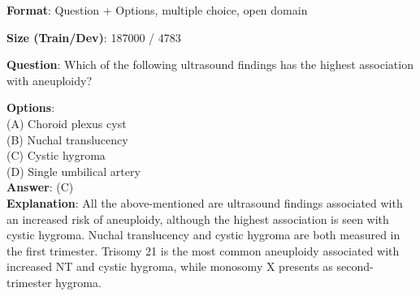 \documentclass{article}
\begin{document}
\begin{myboxnote}[MedMCQA]

\textbf{Format}: Question + Options, multiple choice, open domain

\textbf{Size (Train/Dev)}: 187000 / 4783

\tcblower

\textbf{Question}: Which of the following ultrasound findings has the highest association with aneuploidy?

\textbf{Options}: \\
(A) Choroid plexus cyst \\
(B) Nuchal translucency \\
(C) Cystic hygroma \\
(D) Single umbilical artery \\

\textbf{Answer}: (C) \\
\textbf{Explanation}: All the above-mentioned are ultrasound findings associated with an increased risk of aneuploidy, although the highest association is seen with cystic hygroma. Nuchal translucency and cystic hygroma are both measured in the first trimester. Trisomy 21 is the most common aneuploidy associated with increased NT and cystic hygroma, while monosomy X presents as second-trimester hygroma.
\end{myboxnote}
\end{document}
